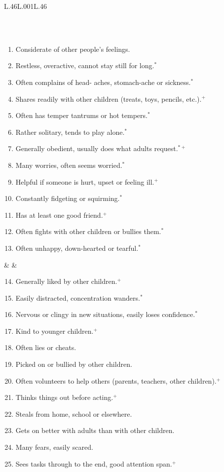 \begin{table}[ht!]
\begin{tabular}{L{.46\linewidth}L{.001\linewidth}L{.46\linewidth}}
\begin{enumerate}
\end{enumerate}
\\
\midrule
{} \\[-1.8em]
\begin{enumerate}
\item Considerate of other people's feelings.
\item Restless, overactive, cannot stay still for long.$^*$
\item Often complains of head- aches, stomach-ache or sickness.$^*$
\item Shares readily with other children (treats, toys, pencils, etc.).$^+$
\item Often has temper tantrums or hot tempers.$^*$
\item Rather solitary, tends to play alone.$^*$
\item Generally obedient, usually does what adults request.$^{* +}$
\item Many worries, often seems worried.$^*$
\item Helpful if someone is hurt, upset or feeling ill.$^+$
\item Constantly fidgeting or squirming.$^*$
\item Has at least one good friend.$^+$
\item Often fights with other children or bullies them.$^*$
\item Often unhappy, down-hearted or tearful.$^*$
\end{enumerate}
& &
\begin{enumerate}\setcounter{enumi}{13}
\item Generally liked by other children.$^+$
\item Easily distracted, concentration wanders.$^*$
\item Nervous or clingy in new situations, easily loses confidence.$^*$
\item Kind to younger children.$^+$
\item Often lies or cheats.
\item Picked on or bullied by other children.
\item Often volunteers to help others (parents, teachers, other children).$^+$
\item Thinks things out before acting.$^+$
\item Steals from home, school or elsewhere.
\item Gets on better with adults than with other children.
\item Many fears, easily scared.
\item Sees tasks through to the end, good attention span.$^+$
\end{enumerate}
\\
\bottomrule
\end{tabular}
\end{table}

